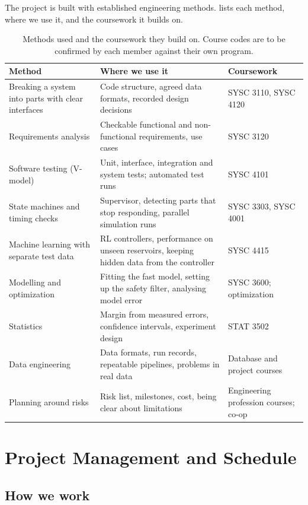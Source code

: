 \documentclass[11pt,letterpaper]{article}
\begin{document}
The project is built with established engineering methods.  lists each
method, where we use it, and the coursework it builds on.

\begin{table}[!htbp]
\caption{Methods used and the coursework they build on. Course codes are to be confirmed by
each member against their own program.}\label{tab:methods}
\small
\begin{tabularx}{\textwidth}{@{}P{4.4cm}LP{3.0cm}@{}}
\toprule
\textbf{Method} & \textbf{Where we use it} & \textbf{Coursework}\\
\midrule
Breaking a system into parts with clear interfaces & Code structure, agreed data formats, recorded design decisions & SYSC 3110, SYSC 4120\\
Requirements analysis & Checkable functional and non-functional requirements, use cases & SYSC 3120\\
Software testing (V-model) & Unit, interface, integration and system tests; automated test runs & SYSC 4101\\
State machines and timing checks & Supervisor, detecting parts that stop responding, parallel simulation runs & SYSC 3303, SYSC 4001\\
Machine learning with separate test data & RL controllers, performance on unseen reservoirs, keeping hidden data from the controller & SYSC 4415\\
Modelling and optimization & Fitting the fast model, setting up the safety filter, analysing model error & SYSC 3600; optimization\\
Statistics & Margin from measured errors, confidence intervals, experiment design & STAT 3502\\
Data engineering & Data formats, run records, repeatable pipelines, problems in real data & Database and project courses\\
Planning around risks & Risk list, milestones, cost, being clear about limitations & Engineering profession courses; co-op\\
\bottomrule
\end{tabularx}
\end{table}

\section{Project Management and Schedule}\label{sec:schedule}

\subsection{How we work}
\end{document}
